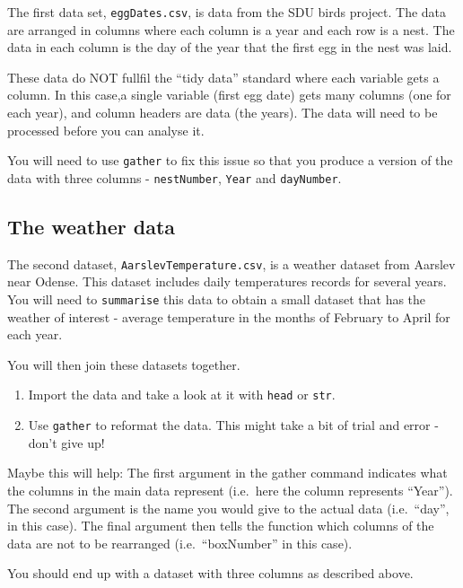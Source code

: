 \documentclass[
  a4paperpaper,
]{book}
\begin{document}
The first data set, \texttt{eggDates.csv}, is data from the SDU birds project. The data are arranged in columns where each column is a year and each row is a nest. The data in each column is the day of the year that the first egg in the nest was laid.

These data do NOT fullfil the ``tidy data'' standard where each variable gets a column. In this case,a single variable (first egg date) gets many columns (one for each year), and column headers are data (the years). The data will need to be processed before you can analyse it.

You will need to use \texttt{gather} to fix this issue so that you produce a version of the data with three columns - \texttt{nestNumber}, \texttt{Year} and \texttt{dayNumber}.

\hypertarget{the-weather-data}{%
\subsection{The weather data}\label{the-weather-data}}

The second dataset, \texttt{AarslevTemperature.csv}, is a weather dataset from Aarslev near Odense. This dataset includes daily temperatures records for several years. You will need to \texttt{summarise} this data to obtain a small dataset that has the weather of interest - average temperature in the months of February to April for each year.

You will then join these datasets together.

\begin{enumerate}
\def\labelenumi{\arabic{enumi}.}
\item
  Import the data and take a look at it with \texttt{head} or \texttt{str}.
\item
  Use \texttt{gather} to reformat the data. This might take a bit of trial and error - don't give up!
\end{enumerate}

Maybe this will help: The first argument in the gather command indicates what the columns in the main data represent (i.e.~here the column represents ``Year''). The second argument is the name you would give to the actual data (i.e.~``day'', in this case). The final argument then tells the function which columns of the data are not to be rearranged (i.e.~``boxNumber'' in this case).

You should end up with a dataset with three columns as described above.
\end{document}
